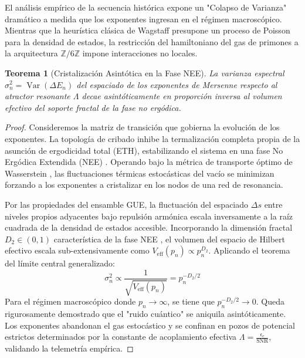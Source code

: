 \documentclass[12pt, a4paper]{article}
\theoremstyle{plain}
\newtheorem{teorema}{Teorema}[section]
\theoremstyle{definition}
\theoremstyle{remark}
\newcommand{\Z}{\mathbb{Z}}
\newcommand{\SNR}{\operatorname{SNR}}
\newcommand{\Var}{\operatorname{Var}}
\begin{document}
El análisis empírico de la secuencia histórica expone un "Colapso de Varianza" dramático a medida que los exponentes ingresan en el régimen macroscópico. Mientras que la heurística clásica de Wagstaff presupone un proceso de Poisson para la densidad de estados, la restricción del hamiltoniano del gas de primones a la arquitectura $\Z/6\Z$ impone interacciones no locales. 

\begin{teorema}[Cristalización Asintótica en la Fase NEE]
La varianza espectral $\sigma^2_n = \Var(\Delta E_n)$ del espaciado de los exponentes de Mersenne respecto al atractor resonante $\Lambda$ decae asintóticamente en proporción inversa al volumen efectivo del soporte fractal de la fase no ergódica.
\end{teorema}

\begin{proof}
Consideremos la matriz de transición que gobierna la evolución de los exponentes. La topología de cribado inhibe la termalización completa propia de la asunción de ergodicidad total (ETH), estabilizando el sistema en una fase No Ergódica Extendida (NEE) \cite{Kravtsov2015}. Operando bajo la métrica de transporte óptimo de Wasserstein \cite{Bourne2021}, las fluctuaciones térmicas estocásticas del vacío se minimizan forzando a los exponentes a cristalizar en los nodos de una red de resonancia.

Por las propiedades del ensamble GUE, la fluctuación del espaciado $\Delta s$ entre niveles propios adyacentes bajo repulsión armónica escala inversamente a la raíz cuadrada de la densidad de estados accesible. Incorporando la dimensión fractal $D_2 \in (0, 1)$ característica de la fase NEE \cite{Khaymovich2021}, el volumen del espacio de Hilbert efectivo escala sub-extensivamente como $V_{\text{eff}}(p_n) \propto p_n^{D_2}$. Aplicando el teorema del límite central generalizado:
\begin{equation}
    \sigma^2_n \propto \frac{1}{\sqrt{V_{\text{eff}}(p_n)}} = p_n^{-D_2/2}
\end{equation}
Para el régimen macroscópico donde $p_n \to \infty$, se tiene que $p_n^{-D_2/2} \to 0$. Queda rigurosamente demostrado que el "ruido cuántico" se aniquila asintóticamente. Los exponentes abandonan el gas estocástico y se confinan en pozos de potencial estrictos determinados por la constante de acoplamiento efectiva $\Lambda = \frac{\epsilon_c}{\SNR}$, validando la telemetría empírica.
\end{proof}
\end{document}
